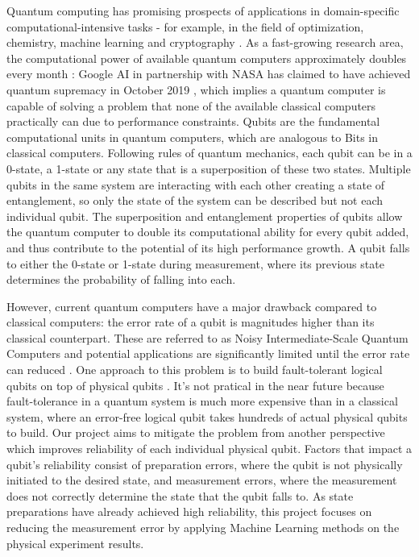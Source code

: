 \documentclass[letterpaper,twocolumn,10pt]{article}
\begin{document}
Quantum computing has promising prospects of applications in domain-specific computational-intensive tasks - for example, in the field of optimization, chemistry, machine learning and cryptography \cite{quantum-application}. As a fast-growing research area, the computational power of available quantum computers approximately doubles every month \cite{quantum-application}: Google AI in partnership with NASA has claimed to have achieved quantum supremacy in October 2019 \cite{google-ai}, which implies a quantum computer is capable of solving a problem that none of the available classical computers practically can due to performance constraints. Qubits are the fundamental computational units in quantum computers, which are analogous to Bits in classical computers. Following rules of quantum mechanics, each qubit can be in a 0-state, a 1-state or any state that is a superposition of these two states. Multiple qubits in the same system are interacting with each other creating a state of entanglement, so only the state of the system can be described but not each individual qubit. The superposition and entanglement properties of qubits allow the quantum computer to double its computational ability for every qubit added, and thus contribute to the potential of its high performance growth. A qubit falls to either the 0-state or 1-state during measurement, where its previous state determines the probability of falling into each. 

However, current quantum computers have a major drawback compared to classical computers: the error rate of a qubit is magnitudes higher than its classical counterpart. These are referred to as Noisy Intermediate-Scale Quantum Computers and potential applications are significantly limited until the error rate can reduced \cite{quantum-application}. One approach to this problem is to build fault-tolerant logical qubits on top of physical qubits \cite{fault-tolerance}. It's not pratical in the near future because fault-tolerance in a quantum system is much more expensive than in a classical system, where an error-free logical qubit takes hundreds of actual physical qubits to build. Our project aims to mitigate the problem from another perspective which improves reliability of each individual physical qubit. Factors that impact a qubit's reliability consist of preparation errors, where the qubit is not physically initiated to the desired state, and measurement errors, where the measurement does not correctly determine the state that the qubit falls to. As state preparations have already achieved high reliability, this project focuses on reducing the measurement error by applying Machine Learning methods on the physical experiment results.
\end{document}
